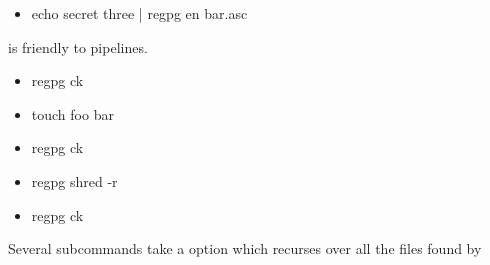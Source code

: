 {  \begin{itemize}
  \item echo secret three | regpg en bar.asc
  \end{itemize}

  \regpg is friendly to pipelines.

  \begin{itemize}
  \item regpg ck
  \item touch foo bar
  \item regpg ck
  \item regpg shred -r
  \item regpg ck
  \end{itemize}

  Several \regpg subcommands take a  option which recurses
  over all the files found by 

}



